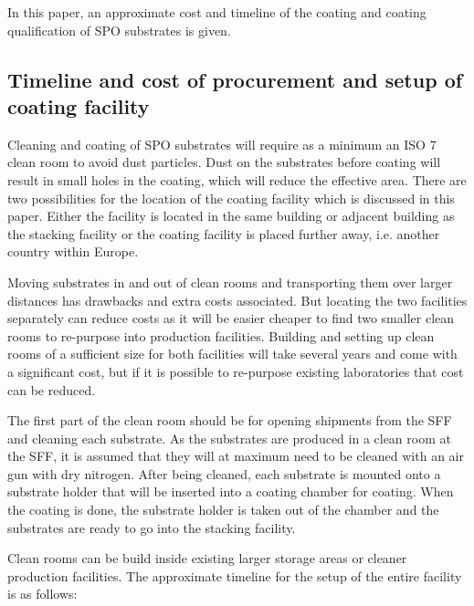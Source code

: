 In this paper, an approximate cost and timeline of the coating and coating qualification of SPO substrates is given.

\subsection{Timeline and cost of procurement and setup of coating facility}

Cleaning and coating of SPO substrates will require as a minimum an ISO 7 clean room to avoid dust particles. Dust on the substrates before coating will result in small holes in the coating, which will reduce the effective area. There are two possibilities for the location of the coating facility which is discussed in this paper. Either the facility is located in the same building or adjacent building as the stacking facility or the coating facility is placed further away, i.e. another country within Europe.

Moving substrates in and out of clean rooms and transporting them over larger distances has drawbacks and extra costs associated. But locating the two facilities separately can reduce costs as it will be easier cheaper to find two smaller clean rooms to re-purpose into production facilities. Building and setting up clean rooms of a sufficient size for both facilities will take several years and come with a significant cost, but if it is possible to re-purpose existing laboratories that cost can be reduced.

The first part of the clean room should be for opening shipments from the SFF and cleaning each substrate. As the substrates are produced in a clean room at the SFF, it is assumed that they will at maximum need to be cleaned with an air gun with dry nitrogen. After being cleaned, each substrate is mounted onto a substrate holder that will be inserted into a coating chamber for coating. When the coating is done, the substrate holder is taken out of the chamber and the substrates are ready to go into the stacking facility.

Clean rooms can be build inside existing larger storage areas or cleaner production facilities. The approximate timeline for the setup of the entire facility is as follows:

